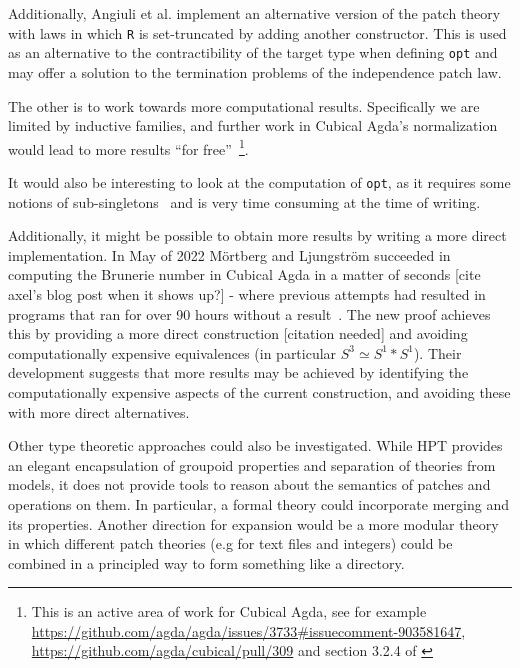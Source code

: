 Additionally, Angiuli et al. implement an alternative version of the patch
theory with laws in which \texttt{R} is set-truncated by adding another
constructor. This is used as an alternative to the contractibility of the target
type when defining \texttt{opt} and may offer a solution to the termination
problems of the independence patch law.

The other is to work towards more computational results.
Specifically we are limited by inductive families, and further work in Cubical
Agda's normalization would lead to more results ``for free''~\footnote{This is
  an active area of work for Cubical Agda, see for example
  \url{https://github.com/agda/agda/issues/3733\#issuecomment-903581647},
  \url{https://github.com/agda/cubical/pull/309} and section 3.2.4 of \cite{vezzosi2021cubical}}.

It would also be interesting to look at the computation of \texttt{opt}, as it requires some
notions of sub-singletons~\cite{Angiuli2016} and is very time consuming at the
time of writing.

Additionally, it might be possible to obtain more results by writing a more
direct implementation. In May of 2022 M\"ortberg and Ljungstr\"om succeeded in
computing the Brunerie number in Cubical Agda in a matter of seconds [cite
axel's blog post when it shows up?] - where previous attempts had resulted in
programs that ran for over 90 hours without a result~\cite{mortberg2018}. The
new proof achieves this by providing a more direct construction [citation
needed] and avoiding computationally expensive equivalences (in particular $S^3
\simeq S^1 \ast S^1$). Their development suggests that more results may be
achieved by identifying the computationally expensive aspects of the current
construction, and avoiding these with more direct alternatives.

Other type theoretic approaches could also be investigated. While HPT provides
an elegant encapsulation of groupoid properties and separation of theories from
models, it does not provide tools to reason about the semantics of patches and
operations on them. In particular, a formal theory could incorporate merging and
its properties. Another direction for expansion would be a more modular theory
in which different patch theories (e.g for text files and integers) could be
combined in a principled way to form something like a directory.